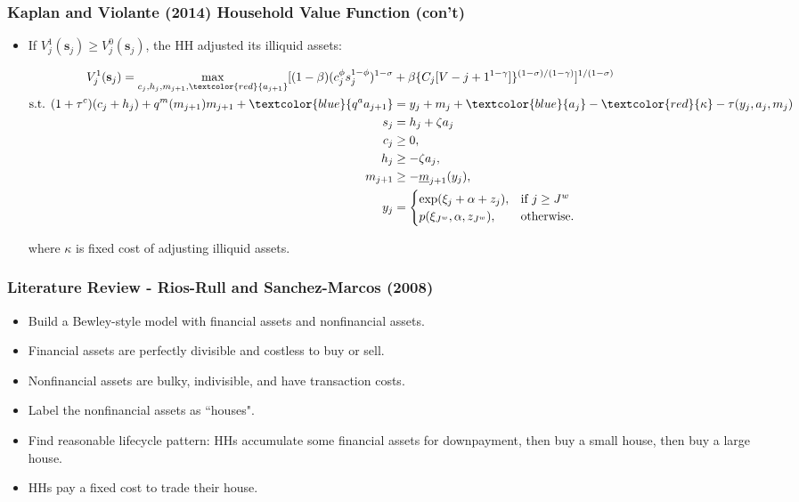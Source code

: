 \documentclass{beamer}
\begin{document}
\begin{frame}
\frametitle{Kaplan and Violante (2014) Household Value Function (con't)}


\begin{itemize}[<+->]

\item If $V_j^1(\mathbf{s}_j) \ge V_j^0(\mathbf{s}_j)$, the HH adjusted its illiquid assets:

\scriptsize

\begin{align*}
V_j^1(\mathbf{s}_j) =\max_{c_j, h_j, m_{j+1}, \textcolor{red}{a_{j+1}}}[(1-\beta) (c_j^\phi s_j^{1-\phi})^{1-\sigma} &+ \beta\{C_j[V-{j+1}^{1-\gamma}]\}^{(1-\sigma)/(1-\gamma)}]^{1/(1-\sigma)}\\
\text{s.t. }
(1+\tau^c)(c_j + h_j) + q^m(m_{j+1}) m_{j+1} + \textcolor{blue}{q^a a_{j+1}}&= y_j + m_j + \textcolor{blue}{a_j} - \textcolor{red}{\kappa} - \tau(y_j, a_j, m_j)\\
s_j &= h_j + \zeta a_j\\
c_j &\ge 0, \\
h_j &\ge - \zeta a_j, \\
m_{j+1} &\ge - \underline{m}_{j+1}(y_j),\\
y_j &= \begin{cases}
\exp(\xi_j + \alpha + z_j), &\text{if } j \ge J^w\\
p(\xi_{J^w}, \alpha, z_{J^w}), &\text{otherwise.}
\end{cases}
\end{align*}

\normalsize

where $\kappa$ is fixed cost of adjusting illiquid assets.

\end{itemize}

\end{frame}









\begin{frame}
\frametitle{Literature Review - Rios-Rull and Sanchez-Marcos (2008)}

\begin{itemize}[<+->]
\item Build a Bewley-style model with financial assets and nonfinancial assets.
\bigskip
\item Financial assets are perfectly divisible and costless to buy or sell.
\bigskip
\item Nonfinancial assets are bulky, indivisible, and have transaction costs.
\bigskip
\item Label the nonfinancial assets as ``houses".
\bigskip
\item Find reasonable lifecycle pattern: HHs accumulate some financial assets for downpayment, then buy a small house, then buy a large house.
\bigskip
\item HHs pay a fixed cost to trade their house.
\end{itemize}

\end{frame}
\end{document}
